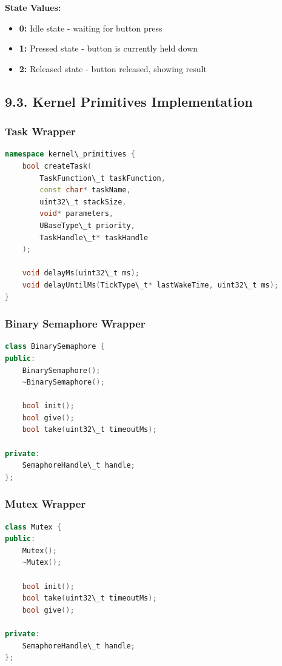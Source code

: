 \documentclass[12pt]{article}
\begin{document}
\textbf{State Values:}
\begin{itemize}
    \item \textbf{0:} Idle state - waiting for button press
    \item \textbf{1:} Pressed state - button is currently held down
    \item \textbf{2:} Released state - button released, showing result
\end{itemize}

\subsection*{9.3. Kernel Primitives Implementation}

\subsubsection*{Task Wrapper}

\begin{lstlisting}[language=C++, caption=Task Creation Wrapper (task.h/cpp)]
namespace kernel\_primitives {
    bool createTask(
        TaskFunction\_t taskFunction,
        const char* taskName,
        uint32\_t stackSize,
        void* parameters,
        UBaseType\_t priority,
        TaskHandle\_t* taskHandle
    );
    
    void delayMs(uint32\_t ms);
    void delayUntilMs(TickType\_t* lastWakeTime, uint32\_t ms);
}
\end{lstlisting}

\subsubsection*{Binary Semaphore Wrapper}

\begin{lstlisting}[language=C++, caption=Binary Semaphore Wrapper (binary\_semaphore.h/cpp)]
class BinarySemaphore {
public:
    BinarySemaphore();
    ~BinarySemaphore();
    
    bool init();
    bool give();
    bool take(uint32\_t timeoutMs);
    
private:
    SemaphoreHandle\_t handle;
};
\end{lstlisting}

\subsubsection*{Mutex Wrapper}

\begin{lstlisting}[language=C++, caption=Mutex Wrapper (mutex.h/cpp)]
class Mutex {
public:
    Mutex();
    ~Mutex();
    
    bool init();
    bool take(uint32\_t timeoutMs);
    bool give();
    
private:
    SemaphoreHandle\_t handle;
};
\end{lstlisting}
\end{document}
